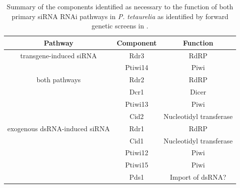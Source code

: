 \begin{table}
    \centering
    \begin{tabular}{|c|c|c|}
        \hline
        \textbf{Pathway} & \textbf{Component} & \textbf{Function} \\
        \hline
        transgene-induced siRNA & Rdr3 & RdRP \\
                                & Ptiwi14 & Piwi \\
                                \hline
        both pathways           & Rdr2 & RdRP \\
                                & Dcr1 & Dicer \\
                                & Ptiwi13 & Piwi \\
                                & Cid2 & Nucleotidyl transferase \\
                                \hline
        exogenous dsRNA-induced siRNA & Rdr1 & RdRP \\
                                      & Cid1 & Nucleotidyl transferase \\
                                      & Ptiwi12 & Piwi \\
                                      & Ptiwi15 & Piwi \\
                                      & Pds1 & Import of dsRNA? \\
        \hline
    \end{tabular}
    \caption[Summary of RNAi pathway components in \textit{P. tetaurelia}]{Summary
        of the components identified as necessary to the function of both
        primary siRNA RNAi pathways in \textit{P. tetaurelia} as identified
        by forward genetic screens in \citep{Marker2014}.}
    \label{tab:marker_components}
\end{table}


